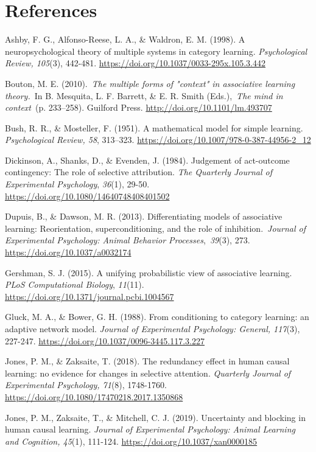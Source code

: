 \documentclass[twocolumn]{article}
\begin{document}
\section*{References}

\begin{hangparas}{1em}{1}

Ashby, F. G., Alfonso-Reese, L. A., \& Waldron, E. M. (1998). A
neuropsychological theory of multiple systems in category learning.
\emph{Psychological Review, 105}(3), 442-481.
\url{https://doi.org/10.1037/0033-295x.105.3.442}

Bouton, M. E. (2010).~\emph{\emph{The multiple forms of "context" in
associative learning theory.}}~In B. Mesquita, L. F. Barrett, \& E. R.
Smith (Eds.),~\emph{The mind in context}~(p. 233--258). Guilford
Press. \url{http://doi.org/10.1101/lm.493707}

Bush, R. R., \& Mosteller, F. (1951). A mathematical model for simple
learning. \emph{Psychological Review, 58}, 313--323.
\url{https://doi.org/10.1007/978-0-387-44956-2_12}

Dickinson, A., Shanks, D., \& Evenden, J. (1984). Judgement of
act-outcome contingency: The role of selective attribution. \emph{The
Quarterly Journal of Experimental Psychology}, \emph{36}(1), 29-50.
\url{https://doi.org/10.1080/14640748408401502}

Dupuis, B., \& Dawson, M. R. (2013). Differentiating models of
associative learning: Reorientation, superconditioning, and the role of
inhibition.~\emph{Journal of Experimental Psychology: Animal Behavior
Processes},~\emph{39}(3), 273. \url{https://doi.org/10.1037/a0032174}

Gershman, S. J. (2015). A unifying probabilistic view of associative
learning. \emph{PLoS Computational Biology}, \emph{11}(11).
\protect\hypertarget{anchor-1}{}{}\url{https://doi.org/10.1371/journal.pcbi.1004567}

Gluck, M. A., \& Bower, G. H. (1988). From conditioning to category
learning: an adaptive network model. \emph{Journal of Experimental
Psychology: General, 117}(3), 227-247.
\url{https://doi.org/10.1037/0096-3445.117.3.227}

Jones, P. M., \& Zaksaite, T. (2018). The redundancy effect in human
causal learning: no evidence for changes in selective attention.
\emph{Quarterly Journal of Experimental Psychology, 71}(8), 1748-1760.
\url{https://doi.org/10.1080/17470218.2017.1350868}

Jones, P. M., Zaksaite, T., \& Mitchell, C. J. (2019). Uncertainty and
blocking in human causal learning. \emph{Journal of Experimental
Psychology: Animal Learning and Cognition, 45}(1), 111-124.
\url{https://doi.org/10.1037/xan0000185}


\end{hangparas}
\end{document}
